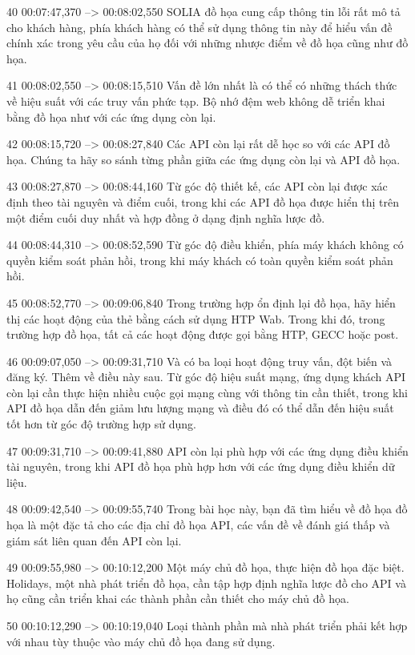 40
00:07:47,370 --> 00:08:02,550
SOLIA đồ họa cung cấp thông tin lỗi rất mô tả cho khách hàng, phía khách hàng có thể sử dụng thông tin này để hiểu vấn đề chính xác trong yêu cầu của họ đối với những nhược điểm về đồ họa cũng như đồ họa.

41
00:08:02,550 --> 00:08:15,510
Vấn đề lớn nhất là có thể có những thách thức về hiệu suất với các truy vấn phức tạp.  Bộ nhớ đệm web không dễ triển khai bằng đồ họa như với các ứng dụng còn lại.

42
00:08:15,720 --> 00:08:27,840
Các API còn lại rất dễ học so với các API đồ họa.  Chúng ta hãy so sánh từng phần giữa các ứng dụng còn lại và API đồ họa.

43
00:08:27,870 --> 00:08:44,160
Từ góc độ thiết kế, các API còn lại được xác định theo tài nguyên và điểm cuối, trong khi các API đồ họa được hiển thị trên một điểm cuối duy nhất và hợp đồng ở dạng định nghĩa lược đồ.

44
00:08:44,310 --> 00:08:52,590
Từ góc độ điều khiển, phía máy khách không có quyền kiểm soát phản hồi, trong khi máy khách có toàn quyền kiểm soát phản hồi.

45
00:08:52,770 --> 00:09:06,840
Trong trường hợp ổn định lại đồ họa, hãy hiển thị các hoạt động của thẻ bằng cách sử dụng HTP Wab.  Trong khi đó, trong trường hợp đồ họa, tất cả các hoạt động được gọi bằng HTP, GECC hoặc post.

46
00:09:07,050 --> 00:09:31,710
Và có ba loại hoạt động truy vấn, đột biến và đăng ký.  Thêm về điều này sau.  Từ góc độ hiệu suất mạng, ứng dụng khách API còn lại cần thực hiện nhiều cuộc gọi mạng cùng với thông tin cần thiết, trong khi API đồ họa dẫn đến giảm lưu lượng mạng và điều đó có thể dẫn đến hiệu suất tốt hơn từ góc độ trường hợp sử dụng.

47
00:09:31,710 --> 00:09:41,880
API còn lại phù hợp với các ứng dụng điều khiển tài nguyên, trong khi API đồ họa phù hợp hơn với các ứng dụng điều khiển dữ liệu.

48
00:09:42,540 --> 00:09:55,740
Trong bài học này, bạn đã tìm hiểu về đồ họa đồ họa là một đặc tả cho các địa chỉ đồ họa API, các vấn đề về đánh giá thấp và giám sát liên quan đến API còn lại.

49
00:09:55,980 --> 00:10:12,200
Một máy chủ đồ họa, thực hiện đồ họa đặc biệt.  Holidays, một nhà phát triển đồ họa, cần tập hợp định nghĩa lược đồ cho API và họ cũng cần triển khai các thành phần cần thiết cho máy chủ đồ họa.

50
00:10:12,290 --> 00:10:19,040
Loại thành phần mà nhà phát triển phải kết hợp với nhau tùy thuộc vào máy chủ đồ họa đang sử dụng.

